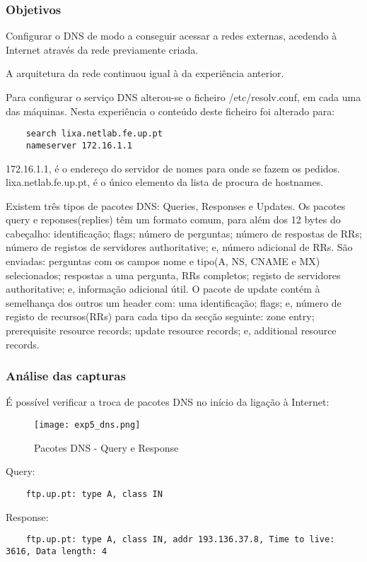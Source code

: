 \documentclass[a4paper]{article}
\begin{document}
\subsubsection{Objetivos}
Configurar o DNS de modo a conseguir acessar a redes externas, acedendo à Internet através da rede previamente criada.

A arquitetura da rede continuou igual à da experiência anterior.

Para configurar o serviço DNS alterou-se o ficheiro /etc/resolv.conf, em cada uma das máquinas. Nesta experiência o conteúdo deste ficheiro foi alterado para:

\begin{verbatim}
	search lixa.netlab.fe.up.pt
	nameserver 172.16.1.1
\end{verbatim}

172.16.1.1, é o endereço do servidor de nomes para onde se fazem os pedidos. lixa.netlab.fe.up.pt, é o único elemento da lista de procura de hostnames.

Existem três tipos de pacotes DNS: Queries, Responses e Updates. Os pacotes query e reponses(replies) têm um formato comum, para além dos 12 bytes do cabeçalho: identificação; flags; número de perguntas; número de respostas de RRs; número de registos de servidores authoritative; e, número adicional de RRs. São enviadas: perguntas com os campos nome e tipo(A, NS, CNAME e MX) selecionados; respostas a uma pergunta, RRs completos; registo de servidores authoritative; e, informação adicional útil. O pacote de update contém à semelhança dos outros um header com: uma identificação; flags; e, número de registo de recursos(RRs) para cada tipo da secção seguinte: zone entry; prerequisite resource records; update resource records; e, additional resource records.

\subsubsection{Análise das capturas}

É possível verificar a troca de pacotes DNS no início da ligação à Internet:
\begin{figure}[h]
    \centering
    \texttt{[image: exp5\_dns.png]}
    \caption{Pacotes DNS - Query e Response}
\end{figure}

Query:
\begin{verbatim}
	ftp.up.pt: type A, class IN
\end{verbatim}
Response:
\begin{verbatim}
	ftp.up.pt: type A, class IN, addr 193.136.37.8, Time to live: 3616, Data length: 4
\end{verbatim}
\end{document}
